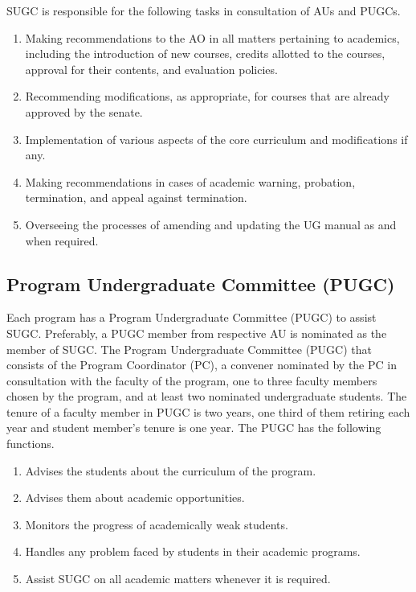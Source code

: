 SUGC is responsible for the following tasks in consultation of AUs and PUGCs.

\begin{enumerate}
	\item Making recommendations to the AO in all matters pertaining to academics, including the introduction of new courses, credits allotted to the courses, approval for their contents, and evaluation policies.
	\item Recommending modifications, as appropriate, for courses that are already approved by the senate.
	\item Implementation of various aspects of the core curriculum and modifications if any.
	\item Making recommendations in cases of academic warning, probation, termination, and appeal against termination.
	\item Overseeing the processes of amending and updating the UG manual as and when required. 
\end{enumerate}

\subsection{Program Undergraduate Committee (PUGC)}

Each program has a Program Undergraduate Committee (PUGC) to assist SUGC. Preferably, a PUGC member from respective AU is nominated as the member of SUGC. The Program Undergraduate Committee (PUGC) that consists of the Program Coordinator (PC), a convener nominated by the PC in consultation with the faculty of the program, one to three faculty members chosen by the program, and at least two nominated undergraduate students. The tenure of a faculty member in PUGC is two years, one third of them retiring each year and student member’s tenure is one year. The PUGC has the following functions.

\begin{enumerate}
	\item Advises the students about the curriculum of the program. 
	\item Advises them about academic opportunities. 
	\item Monitors the progress of academically weak students. 
	\item Handles any problem faced by students in their academic programs.
	\item Assist SUGC on all academic matters whenever it is required.
\end{enumerate}

